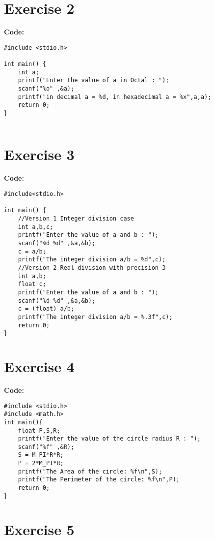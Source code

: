 \documentclass[12pt]{article}
\begin{document}
\section*{Exercise 2}
\vspace{0.5cm}

\textbf{Code:} 
\begin{lstlisting}
#include <stdio.h>

int main() {
	int a;
	printf("Enter the value of a in Octal : ");
	scanf("%o" ,&a);
	printf("in decimal a = %d, in hexadecimal a = %x",a,a);
	return 0;
}
	
\end{lstlisting}
\vspace{1cm}

\section*{Exercise 3}
\vspace{0.5cm}

\textbf{Code:} 
\begin{lstlisting}
#include<stdio.h>

int main() {
	//Version 1 Integer division case
	int a,b,c;
	printf("Enter the value of a and b : ");
	scanf("%d %d" ,&a,&b);
	c = a/b;
	printf("The integer division a/b = %d",c);
	//Version 2 Real division with precision 3
	int a,b;
	float c;
	printf("Enter the value of a and b : ");
	scanf("%d %d" ,&a,&b);
	c = (float) a/b;
	printf("The integer division a/b = %.3f",c);
	return 0;
}
\end{lstlisting}
\vspace{1cm}

\section*{Exercise 4}
\vspace{0.5cm}

\textbf{Code:}
\begin{lstlisting}
#include <stdio.h>
#include <math.h>
int main(){
	float P,S,R;
	printf("Enter the value of the circle radius R : ");
	scanf("%f" ,&R);
	S = M_PI*R*R;
	P = 2*M_PI*R;
	printf("The Area of the circle: %f\n",S);
	printf("The Perimeter of the circle: %f\n",P);
	return 0;
}
\end{lstlisting}
\vspace{1cm}
\section*{Exercise 5}
\vspace{0.5cm}
\end{document}
